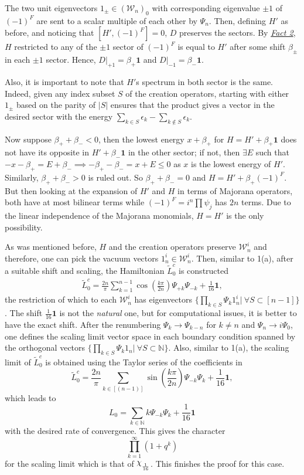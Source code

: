 \documentclass[twoside,11pt,titlepage]{amsart}
\renewcommand{\=}[1]{\stackrel{#1}{=}} %
\theoremstyle{definition}
\theoremstyle{remark}
\DeclareRobustCommand{\rchi}{{\mathpalette\irchi\relax}}
\newcommand{\irchi}[2]{\raisebox{\depth}{$#1\chi$}}
\begin{document}
The two unit eigenvectors $1_{\pm} \in (\mathcal{W}_n)_0$ with corresponding eigenvalue $\pm 1$ of $(-1)^F$ are sent to a scalar multiple of each other by $\Psi_n$. Then, defining $H'$ as before, and noticing that $[H',(-1)^F]=0$, $D$ preserves the sectors. By \hyperref[fct2]{\textit{Fact 2}}, $H$ restricted to any of the $\pm1$ sector of $(-1)^F$ is equal to $H'$ after some shift $\beta_{\pm}$ in each $\pm1$ sector. Hence, $D|_{+1}=\beta_+\textbf{1}$ and $D|_{-1}=\beta_-\textbf{1}$.

Also, it is important to note that $H'$s spectrum in both sector is the same. Indeed, given any index subset $S$ of the creation operators, starting with either $1_{\pm}$ based on the parity of $|S|$ ensures that the product gives a vector in the desired sector with the energy $\sum_{k \in S} \epsilon_k-\sum_{k \not \in S} \epsilon_k$.

Now suppose $\beta_++\beta_-<0$, then the lowest energy $x+\beta_+$ for $H=H'+\beta_+\textbf{1}$ does not have its opposite in $H'+\beta_-\textbf{1}$ in the other sector; if not, then $\exists E$ such that $-x-\beta_+=E+\beta_- \implies -\beta_+-\beta_-=x+E \le 0$ as $x$ is the lowest energy of $H'$. Similarly, $\beta_++\beta_->0$ is ruled out. So $\beta_++\beta_-=0$ and $H=H'+\beta_+(-1)^F$. But then looking at the expansion of $H'$ and $H$ in terms of Majorana operators, both have at most bilinear terms while $(-1)^F=i^{n} \prod \psi_j$ has $2n$ terms. Due to the linear independence of the Majorana monomials, $H=H'$ is the only possibility.

As was mentioned before, $H$ and the creation operators preserve $\mathcal{W}_n^i$ and therefore, one can pick the vacuum vectors $1_n^i \in \mathcal{W}_n^i$. Then, similar to 1(a), after a suitable shift and scaling, the Hamiltonian $\widetilde{L}_0^c$ is constructed
\begin{align}\label{eq22}
\widetilde{L}_0^c=\frac{2n}{\pi}\sum_{k=1}^{n-1} \cos(\frac{k\pi}{2n})\Psi_{+k}\Psi_{-k}+\frac{1}{16}\textbf{1},
\end{align}
the restriction of which to each $\mathcal{W}_n^i$ has eigenvectors $\{ \prod_{k \in S} \Psi_k 1_n^i| \ \forall S \subset [n-1]\}$. The shift $\frac{1}{16}\textbf{1}$ is not the \textit{natural} one, but for computational issues, it is better to have the exact shift. After the renumbering $\Psi_k \rightarrow \Psi_{k-n}$ for $k\neq n$ and $\Psi_n \to i\Psi_0$, one defines the scaling limit vector space in each boundary condition spanned by the orthogonal vectors $\{ \prod_{k \in S} \Psi_k 1_n| \ \forall S \subset \mathbb{N}\}$. Also, similar to 1(a), the scaling limit of $\widetilde{L}_0^c$ is obtained using the Taylor series of the coefficients in 
$$\widetilde{L}_0^c = \frac{2n}{\pi}\sum_{k \in [(n-1)]} \sin(\frac{k\pi}{2n})\Psi_{-k}\Psi_{k}+\frac{1}{16}\textbf{1},$$
which leads to
$$L_0=\sum_{k \in \mathbb{N}} k\Psi_{-k}\Psi_k+\frac{1}{16}\textbf{1}$$
with the desired rate of convergence. This gives the character
$$\prod_{k=1}^{\infty} (1+q^{k})$$
for the scaling limit which is that of $\rchi_\frac{1}{16}$. This finishes the proof for this case.
\end{document}

